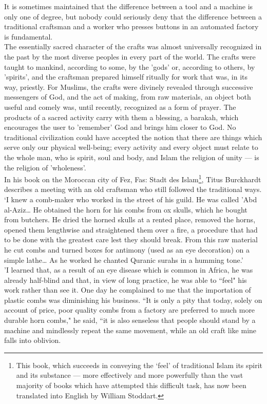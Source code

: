 \documentclass[10pt, twoside]{book}
\begin{document}
It is sometimes maintained that the difference between a tool and a machine is only one of degree, 
but nobody could seriously deny that the difference between a traditional craftsman and a worker who 
presses buttons in an automated factory is fundamental. \\

The essentially sacred character of the crafts was almost universally recognized in the past by the 
most diverse peoples in every part of the world. The crafts were taught to mankind, according to 
some, by the 'gods' or, according to others, by 'spirits', and the craftsman prepared himself 
ritually for work that was, in its way, priestly. For Muslims, the crafts were divinely revealed 
through successive messengers of God, and the act of making, from raw materials, an object both 
useful and comely was, until recently, recognized as a form of prayer. The products of a sacred 
activity carry with them a blessing, a barakah, which encourages the user to 'remember' God and 
brings him closer to God. No traditional civilization could have accepted the notion that there are 
things which serve only our physical well\hyp{}being; every activity and every object must relate to the 
whole man, who is spirit, soul and body, and Islam the religion of unity --- is the religion of 
'wholeness'. \\

In his book on the Moroccan city of Fez, Fas: Stadt des Islam\footnote{This book, which succeeds in conveying the `feel' of traditional Islam its spirit and its substance --- more effectively and more powerfully than the vast majority of books which have attempted this 
difficult task, has now been translated into English by William Stoddart.}, Titus Burckhardt describes a 
meeting with an old craftsman who still followed the traditional ways. `I knew a comb\hyp{}maker who 
worked in the street of his guild. He was called 'Abd al\hyp{}Aziz\ldots{} He obtained the horn for his combs 
from ox skulls, which he bought from butchers. He dried the horned skulls at a rented place, removed 
the horns, opened them lengthwise and straightened them over a fire, a procedure that had to be done 
with the greatest care lest they should break. From this raw material he cut combs and turned boxes 
for antimony (used as an eye decoration) on a simple lathe\ldots{} As he worked he chanted Quranic surahs in a humming tone.' \\

'I learned that, as a result of an eye disease which is common in Africa, he was already half\hyp{}blind 
and that, in view of long practice, he was able to ``feel" his work rather than see it. One day he 
complained to me that the importation of plastic combs was diminishing his business. ``It is only a 
pity that today, solely on account of price, poor quality combs from a factory are preferred to much 
more durable horn combs," he said, ``it is also senseless that people should stand by a machine and 
mindlessly repeat the same movement, while an old craft like mine falls into oblivion. \\
\end{document}
